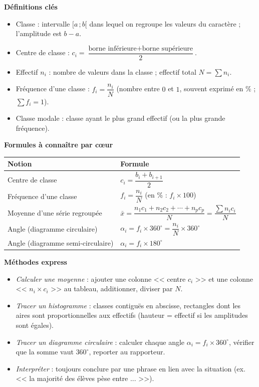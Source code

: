 \documentclass[11pt]{article}
\newcommand{\cle}[1]{{\popxbold\color{popdark}#1}}
\begin{document}
\begin{bilan}
\textbf{D\'efinitions cl\'es}
\begin{itemize}
  \item \cle{Classe} : intervalle $[a\,;b[$ dans lequel on regroupe les valeurs du caract\`ere ; l'\cle{amplitude} est $b-a$.
  \item \cle{Centre de classe} : $c_i=\dfrac{\text{borne inf\'erieure}+\text{borne sup\'erieure}}{2}$.
  \item \cle{Effectif} $n_i$ : nombre de valeurs dans la classe ; \cle{effectif total} $N=\sum n_i$.
  \item \cle{Fr\'equence} d'une classe : $f_i=\dfrac{n_i}{N}$ (nombre entre $0$ et $1$, souvent exprim\'e en \% ; $\sum f_i=1$).
  \item \cle{Classe modale} : classe ayant le plus grand effectif (ou la plus grande fr\'equence).
\end{itemize}

\textbf{Formules \`a conna\^itre par c\oe ur}
\begin{center}
\begin{tabularx}{\linewidth}{|l|X|}
\hline
\rowcolor{popblueL} \textbf{Notion} & \textbf{Formule} \\
\hline
Centre de classe & $c_i=\dfrac{b_i+b_{i+1}}{2}$ \\
\hline
Fr\'equence d'une classe & $f_i=\dfrac{n_i}{N}$ \quad (en \% : $f_i\times 100$) \\
\hline
Moyenne d'une s\'erie regroup\'ee & $\bar{x}=\dfrac{n_1c_1+n_2c_2+\cdots+n_pc_p}{N}=\dfrac{\sum n_ic_i}{N}$ \\
\hline
Angle (diagramme circulaire) & $\alpha_i=f_i\times 360^\circ=\dfrac{n_i}{N}\times 360^\circ$ \\
\hline
Angle (diagramme semi-circulaire) & $\alpha_i=f_i\times 180^\circ$ \\
\hline
\end{tabularx}
\end{center}

\textbf{M\'ethodes express}
\begin{itemize}
  \item \emph{Calculer une moyenne} : ajouter une colonne << centre $c_i$ >> et une colonne << $n_i\times c_i$ >> au tableau, additionner, diviser par $N$.
  \item \emph{Tracer un histogramme} : classes contigu\"es en abscisse, rectangles dont les \cle{aires} sont proportionnelles aux effectifs (hauteur = effectif si les amplitudes sont \'egales).
  \item \emph{Tracer un diagramme circulaire} : calculer chaque angle $\alpha_i=f_i\times 360^\circ$, v\'erifier que la somme vaut $360^\circ$, reporter au rapporteur.
  \item \emph{Interpr\'eter} : toujours conclure par une phrase en lien avec la situation (ex. << la majorit\'e des \'el\`eves p\`ese entre ... >>).
\end{itemize}
\end{bilan}
\end{document}
